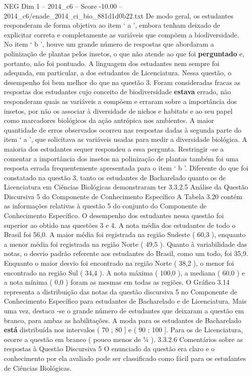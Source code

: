 \begin{textsample}{NEG Dim 1 – 2014\_c6 – Score -10.00 – 2014\_c6/enade\_2014\_ci\_bio\_881d1d0b22.txt}
De modo geral, os estudantes responderam de forma objetiva ao item ‘ a ’, embora tenham deixado de explicitar correta e completamente as variáveis que compõem a biodiversidade.
No item ‘ b ’, houve um grande número de respostas que abordaram a polinização de plantas pelos insetos, o que não atende ao que foi \textbf{perguntado} e, portanto, não foi pontuado.
A linguagem dos estudantes nem sempre foi adequada, em particular, a dos estudantes de Licenciatura.
Nessa questão, o desempenho foi bem melhor do que na questão 3.
Foram consideradas fracas as respostas dos estudantes cujo conceito de biodiversidade \textbf{estava} errado, não responderam quais as variáveis a compõem e erraram sobre a importância dos insetos, por não os associar à diversidade de nichos e habitats e ao seu papel como marcadores biológicos da ação antrópica nos ambientes.
A maior quantidade de erros observados ocorreu nas respostas dadas à segunda parte do item ‘ a ’, que solicitava as variáveis usadas para medir a diversidade biológica.
A maioria dos estudantes sequer respondeu a essa pergunta.
Restringir -se a comentar a importância dos insetos na polinização de plantas também foi uma resposta errada frequentemente apresentada para o item ‘ b ’.
Diferente do que foi constatado na questão 3, tanto os estudantes de Bacharelado quanto os de Licenciatura em Ciências Biológicas demonstraram ter 3.3.2.5 Análise da Questão Discursiva 5 do Componente de Conhecimento Específico A Tabela 3.20 contém as informações relativas à questão 5 do conjunto do Componente de Conhecimento Específico.
O desempenho dos estudantes nessa questão foi superior ao obtido nas questões 3 e 4.
A nota média dos estudantes de todo o Brasil foi 56,0.
A maior média foi registrada na região Sudeste ( 60,3 ), enquanto a menor média foi registrada na região Norte ( 49,5 ).
Quanto à variabilidade das notas, o desvio padrão referente aos estudantes do Brasil, como um todo, foi 35,9.
Enquanto o maior desvio foi encontrado na região Norte ( 38,2 ), o menor foi encontrado na região Sul ( 34,4 ).
A nota máxima ( 100,0 ), a mediana ( 60,0 ) e a nota mínima ( 0,0 ) foram as mesmas em todas as regiões.
O Gráfico 3.14 representa a distribuição das notas da questão discursiva 5 no Componente de Conhecimento Específico para estudantes de Bacharelado e de Licenciatura.
Mais uma vez, destaca -se o grande número de estudantes que deixaram a questão em branco, para ambas as habilitações.
A moda para os estudantes de Bacharelado \textbf{está} distribuída nos intervalos ( 70 ; 80 ] e ( 90 ; 100 ].
Para os de Licenciatura, ocorre a questão em branco ( pouco menos de ¼ ). 3.3.2.6 Comentários sobre as respostas à Questão Discursiva 5 O enunciado da questão era claro e o conhecimento por ela avaliado pode ser classificado como fácil para os estudantes de Ciências Biológicas.

\end{textsample}

